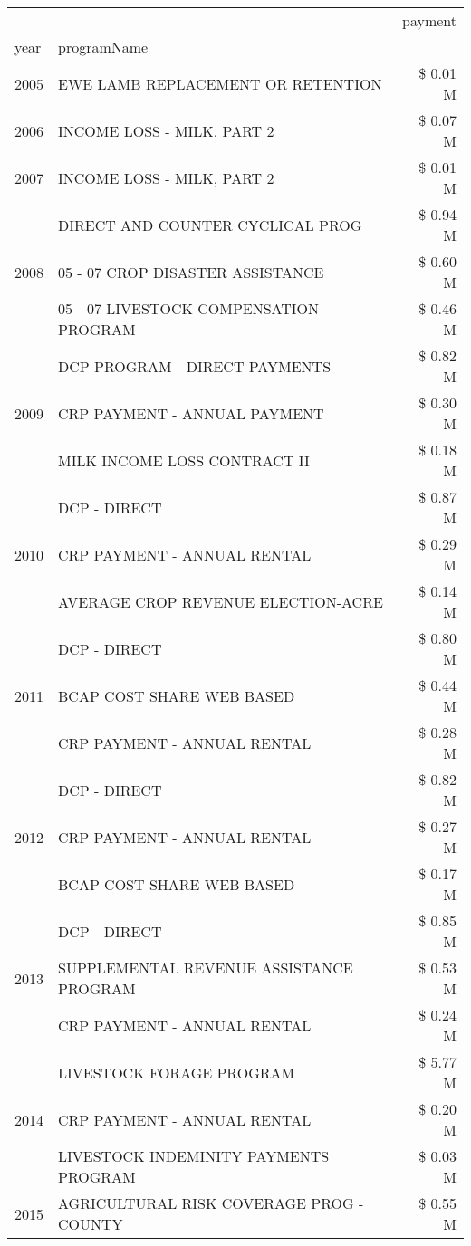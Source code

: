 \begin{tabular}{llr}
\toprule
 &  & payment \\
year & programName &  \\
\midrule
2005 & EWE LAMB REPLACEMENT OR RETENTION & \$ 0.01 M \\
\cline{1-3}
2006 & INCOME LOSS - MILK, PART 2 & \$ 0.07 M \\
\cline{1-3}
2007 & INCOME LOSS - MILK, PART 2 & \$ 0.01 M \\
\cline{1-3}
\multirow[t]{3}{*}{2008} & DIRECT AND COUNTER CYCLICAL PROG & \$ 0.94 M \\
 & 05 - 07 CROP DISASTER ASSISTANCE & \$ 0.60 M \\
 & 05 - 07 LIVESTOCK COMPENSATION PROGRAM & \$ 0.46 M \\
\cline{1-3}
\multirow[t]{3}{*}{2009} & DCP PROGRAM - DIRECT PAYMENTS & \$ 0.82 M \\
 & CRP PAYMENT - ANNUAL PAYMENT & \$ 0.30 M \\
 & MILK INCOME LOSS CONTRACT II & \$ 0.18 M \\
\cline{1-3}
\multirow[t]{3}{*}{2010} & DCP - DIRECT & \$ 0.87 M \\
 & CRP PAYMENT - ANNUAL RENTAL & \$ 0.29 M \\
 & AVERAGE CROP REVENUE ELECTION-ACRE & \$ 0.14 M \\
\cline{1-3}
\multirow[t]{3}{*}{2011} & DCP - DIRECT & \$ 0.80 M \\
 & BCAP COST SHARE WEB BASED & \$ 0.44 M \\
 & CRP PAYMENT - ANNUAL RENTAL & \$ 0.28 M \\
\cline{1-3}
\multirow[t]{3}{*}{2012} & DCP - DIRECT & \$ 0.82 M \\
 & CRP PAYMENT - ANNUAL RENTAL & \$ 0.27 M \\
 & BCAP COST SHARE WEB BASED & \$ 0.17 M \\
\cline{1-3}
\multirow[t]{3}{*}{2013} & DCP - DIRECT & \$ 0.85 M \\
 & SUPPLEMENTAL REVENUE ASSISTANCE PROGRAM & \$ 0.53 M \\
 & CRP PAYMENT - ANNUAL RENTAL & \$ 0.24 M \\
\cline{1-3}
\multirow[t]{3}{*}{2014} & LIVESTOCK FORAGE PROGRAM & \$ 5.77 M \\
 & CRP PAYMENT - ANNUAL RENTAL & \$ 0.20 M \\
 & LIVESTOCK INDEMINITY PAYMENTS PROGRAM & \$ 0.03 M \\
\cline{1-3}
\multirow[t]{3}{*}{2015} & AGRICULTURAL RISK COVERAGE PROG - COUNTY & \$ 0.55 M \\

\end{tabular}
